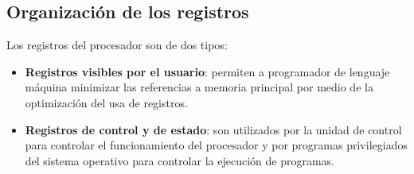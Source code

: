 \subsection{Organización de los registros}

Los registros del procesador son de dos tipos:

\begin{itemize}
  \item \textbf{Registros visibles por el usuario}: permiten a programador de lenguaje máquina minimizar las referencias a memoria principal por medio de la optimización del usa de registros.
  \item \textbf{Registros de control y de estado}: son utilizados por la unidad de control para controlar el funcionamiento del procesador y por programas privilegiados del sistema operativo para controlar la ejecución de programas.
\end{itemize}

